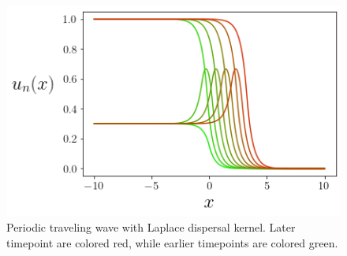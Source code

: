 \documentclass[11pt]{article}
\theoremstyle{definition}
\numberwithin{equation}{section}
\numberwithin{thm}{section}
\begin{document}
\begin{figure}[h!]
\centering
  \includegraphics[scale=0.5]{figures/fig3.png}
\caption{Periodic traveling wave with Laplace dispersal kernel. Later timepoint are colored red, while earlier timepoints are colored green.}
\label{fig:laplacewave}
\end{figure}
\end{document}
